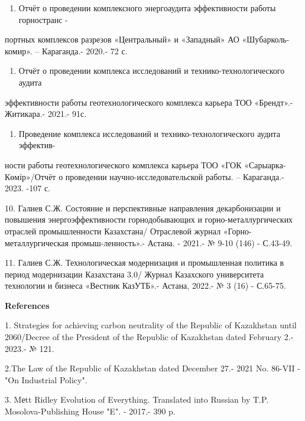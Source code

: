 \begin{enumerate}
\def\labelenumi{\arabic{enumi}.}
\setcounter{enumi}{6}
\item
  Отчёт о проведении комплексного энергоаудита эффективности работы
  горностранс -
\end{enumerate}

портных комплексов разрезов «Центральный» и «Западный» АО
«Шубарколь-комир». -- Караганда.- 2020.- 72 с.

\begin{enumerate}
\def\labelenumi{\arabic{enumi}.}
\setcounter{enumi}{7}
\item
  Отчёт о проведении комплекса исследований и технико-технологического
  аудита
\end{enumerate}

эффективности работы геотехнологического комплекса карьера ТОО
«Брендт».- Житикара.- 2021.- 91с.

\begin{enumerate}
\def\labelenumi{\arabic{enumi}.}
\setcounter{enumi}{8}
\item
  Проведение комплекса исследований и технико-технологического аудита
  эффектив-
\end{enumerate}

ности работы геотехнологического комплекса карьера ТОО «ГОК
«Сарыарка-Көмір»/Отчёт о проведении научно-исследовательской работы. --
Караганда.- 2023. -107 с.

10. Галиев С.Ж. Состояние и перспективные направления декарбонизации и
повышения энергоэффективности горнодобывающих и горно-металлургических
отраслей промышленности Казахстана/ Отраслевой журнал
«Горно-металлургическая промыш-ленность».- Астана. - 2021.- № 9-10 (146)
- С.43-49.

11. Галиев С.Ж. Технологическая модернизация и промышленная политика в
период модернизации Казахстана 3.0/ Журнал Казахского университета
технологии и бизнеса «Вестник КазУТБ».- Астана, 2022.- № 3 (16) -
С.65-75.

{\bfseries References}

1. Strategies for achieving carbon neutrality of the Republic of
Kazakhstan until 2060/Decree of the President of the Republic of
Kazakhstan dated February 2.- 2023.- № 121.

2.The Law of the Republic of Kazakhstan dated December 27.- 2021 No.
86-VII -"On Industrial Policy".

3. Mеtt Ridley Evolution of Everything. Translated into Russian by T.P.
Mosolova-Publishing House "E". - 2017.- 390 p.

